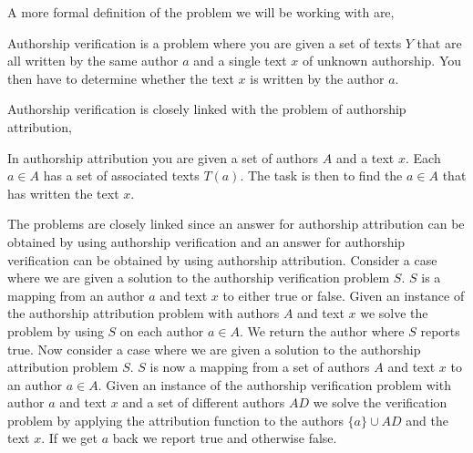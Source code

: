 
A more formal definition of the problem we will be working with are,

\begin{definition}

    Authorship verification is a problem where you are given a set of texts $Y$
    that are all written by the same author $a$ and a single text $x$ of unknown
    authorship. You then have to determine whether the text $x$ is written by
    the author $a$.

\end{definition}

Authorship verification is closely linked with the problem of authorship
attribution,

\begin{definition}

    In authorship attribution you are given a set of authors $A$ and a text $x$.
    Each $a \in A$ has a set of associated texts $T(a)$. The task is then to
    find the $a \in A$ that has written the text $x$.

\end{definition}

The problems are closely linked since an answer for authorship attribution can
be obtained by using authorship verification and an answer for authorship
verification can be obtained by using authorship attribution. Consider a case
where we are given a solution to the authorship verification problem $S$. $S$ is
a mapping from an author $a$ and text $x$ to either true or false. Given an
instance of the authorship attribution problem with authors $A$ and text $x$ we
solve the problem by using $S$ on each author $a \in A$. We return the author
where $S$ reports true. Now consider a case where we are given a solution to the
authorship attribution problem $S$. $S$ is now a mapping from a set of authors
$A$ and text $x$ to an author $a \in A$. Given an instance of the authorship
verification problem with author $a$ and text $x$ and a set of different authors
$AD$ we solve the verification problem by applying the attribution function to
the authors $\{a\} \cup AD$ and the text $x$. If we get $a$ back we report
true and otherwise false.
